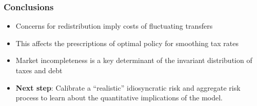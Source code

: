 \documentclass{beamer}
\begin{document}
\begin{frame}
 \frametitle{Conclusions}
 \begin{itemize}
  \item Concerns for redistribution imply costs of fluctuating transfers
  \item This affects the prescriptions of optimal policy for smoothing tax rates
  \item Market incompleteness is a key determinant of the invariant distribution of taxes and debt
  \item \textbf{Next step}: Calibrate a ``realistic'' idiosyncratic risk and aggregate risk process to learn about the quantitative implications of the model.

%
%
 \end{itemize}

\end{frame}
\end{document}
